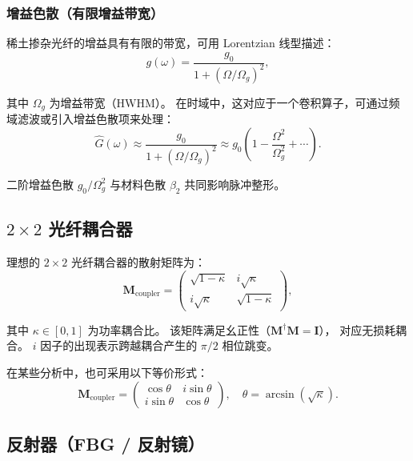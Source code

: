 \documentclass[11pt,a4paper]{ctexart}
\begin{document}
\subsubsection{增益色散（有限增益带宽）}

稀土掺杂光纤的增益具有有限的带宽，可用 Lorentzian 线型描述：
\begin{equation}
  g(\omega) = \frac{g_0}{1 + (\Omega / \Omega_g)^2},
  \label{eq:gain_dispersion}
\end{equation}

其中 $\Omega_g$ 为增益带宽（HWHM）。
在时域中，这对应于一个卷积算子，可通过频域滤波或引入增益色散项来处理：
\begin{equation}
  \hat{G}(\omega) \approx \frac{g_0}{1 + (\Omega/\Omega_g)^2}
  \approx g_0\left(1 - \frac{\Omega^2}{\Omega_g^2} + \cdots\right).
  \label{eq:gain_parabolic}
\end{equation}

二阶增益色散 $g_0/\Omega_g^2$ 与材料色散 $\beta_2$ 共同影响脉冲整形。

\subsection{$2\times2$ 光纤耦合器}

理想的 $2\times2$ 光纤耦合器的散射矩阵为：
\begin{equation}
  \mathbf{M}_{\text{coupler}} =
  \begin{pmatrix}
    \sqrt{1-\kappa} & i\sqrt{\kappa} \\[2pt]
    i\sqrt{\kappa}  & \sqrt{1-\kappa}
  \end{pmatrix},
  \label{eq:M_coupler}
\end{equation}

其中 $\kappa \in [0,1]$ 为功率耦合比。
该矩阵满足幺正性（$\mathbf{M}^\dagger \mathbf{M} = \mathbf{I}$），
对应无损耗耦合。
$i$ 因子的出现表示跨越耦合产生的 $\pi/2$ 相位跳变。

在某些分析中，也可采用以下等价形式：
\begin{equation}
  \mathbf{M}_{\text{coupler}} =
  \begin{pmatrix}
    \cos\theta & i\sin\theta \\
    i\sin\theta  & \cos\theta
  \end{pmatrix},
  \quad \theta = \arcsin(\sqrt{\kappa}).
  \label{eq:M_coupler_angle}
\end{equation}

\subsection{反射器（FBG / 反射镜）}
\end{document}
